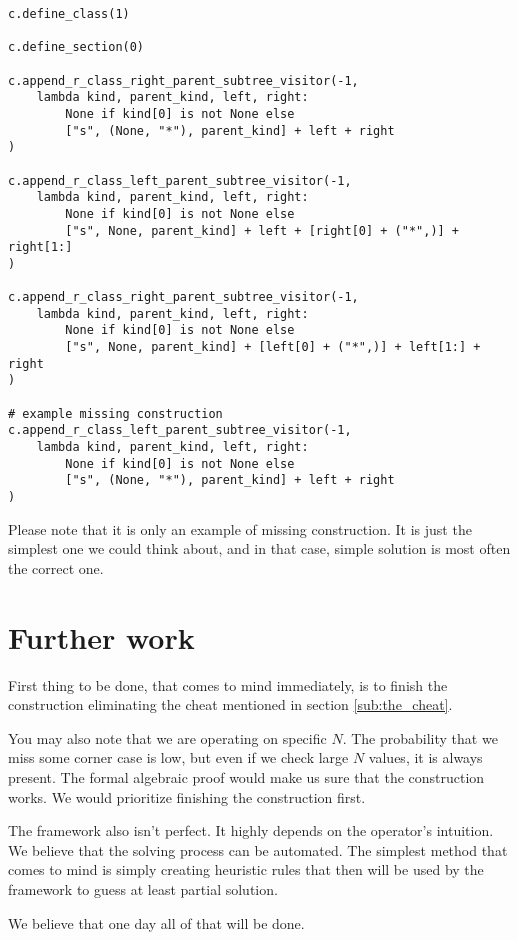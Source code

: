 \documentclass[final]{article}
\theoremstyle{definition}
\theoremstyle{remark}
\begin{document}
\begin{lstlisting}
c.define_class(1)

c.define_section(0)

c.append_r_class_right_parent_subtree_visitor(-1,
    lambda kind, parent_kind, left, right:
        None if kind[0] is not None else
        ["s", (None, "*"), parent_kind] + left + right
)

c.append_r_class_left_parent_subtree_visitor(-1,
    lambda kind, parent_kind, left, right:
        None if kind[0] is not None else
        ["s", None, parent_kind] + left + [right[0] + ("*",)] + right[1:]
)

c.append_r_class_right_parent_subtree_visitor(-1,
    lambda kind, parent_kind, left, right:
        None if kind[0] is not None else
        ["s", None, parent_kind] + [left[0] + ("*",)] + left[1:] + right
)

# example missing construction
c.append_r_class_left_parent_subtree_visitor(-1,
    lambda kind, parent_kind, left, right:
        None if kind[0] is not None else
        ["s", (None, "*"), parent_kind] + left + right
)
\end{lstlisting}

Please note that it is only an example of missing construction. It is just the simplest one we could think about, and in that case, simple solution is most often the correct one.

\section{Further work}%
\label{sec:further_work}

First thing to be done, that comes to mind immediately, is to finish the construction eliminating the cheat mentioned in section \ref{sub:the_cheat}.

You may also note that we are operating on specific \(N\). The probability that we miss some corner case is low, but even if we check large \(N\) values, it is always present. The formal algebraic proof would make us sure that the construction works. We would prioritize finishing the construction first.

The framework also isn't perfect. It highly depends on the operator's intuition. We believe that the solving process can be automated. The simplest method that comes to mind is simply creating heuristic rules that then will be used by the framework to guess at least partial solution.

We believe that one day all of that will be done.
\end{document}

